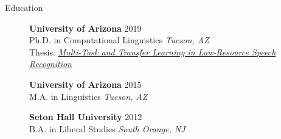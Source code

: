 \documentclass{resume} %
\begin{document}
\vspace{.5cm}
\begin{rSection}{Education}

    \begin{figure}[H]
    \begin{minipage}{0.2\textwidth}
      \centering
      
    \end{minipage}
    \begin{minipage}{0.8\textwidth}
      {\bf University of Arizona} \hfill {2019} \\
      Ph.D. in Computational Linguistics \hfill {\em Tucson, AZ}\\
      Thesis: \href{http://jrmeyer.github.io/misc/MEYER_dissertation_2019.pdf}{\textit{Multi-Task and Transfer Learning in Low-Resource Speech Recognition}}
    \end{minipage}
    \end{figure}
    
  \begin{figure}[H]
    \begin{minipage}{0.2\textwidth}
      \centering
      
    \end{minipage}
    \begin{minipage}{0.8\textwidth}
{\bf University of Arizona} \hfill {2015} \\
M.A. in Linguistics \hfill {\em Tucson, AZ}
    \end{minipage}
  \end{figure}
  
  \begin{figure}[H]
    \begin{minipage}{0.2\textwidth}
      \centering
      
    \end{minipage}
    \begin{minipage}{0.8\textwidth}
{\bf Seton Hall University} \hfill {2012} \\
B.A. in Liberal Studies \hfill {\em South Orange, NJ}
    \end{minipage}
  \end{figure}



\end{rSection}
\end{document}
